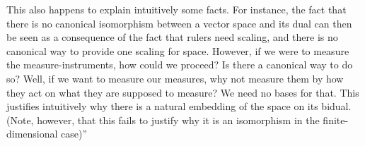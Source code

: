 \documentclass[UTF8,11pt,a4paper]{ctexart}%
\begin{document}
This also happens to explain intuitively some facts. For instance, the fact that there is no canonical isomorphism between a vector space and its dual can then be seen as a consequence of the fact that rulers need scaling, and there is no canonical way to provide one scaling for space. However, if we were to measure the measure-instruments, how could we proceed? Is there a canonical way to do so? Well, if we want to measure our measures, why not measure them by how they act on what they are supposed to measure? We need no bases for that. This justifies intuitively why there is a natural embedding of the space on its bidual. (Note, however, that this fails to justify why it is an isomorphism in the finite-dimensional case)''

\end{document}
